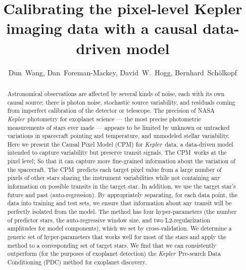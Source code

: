 \documentclass[12pt, preprint]{aastex}
\newcommand{\project}[1]{\textsl{#1}}
\newcommand{\Kepler}{\project{Kepler}}
\newcommand{\name}{CPM}
\begin{document}
\title{
  Calibrating the pixel-level Kepler imaging data with a causal data-driven model
 \\ 
}
\author{%
  Dun~Wang\altaffilmark{\ref{CCPP}},
  Dan~Foreman-Mackey\altaffilmark{\ref{CCPP}},
  David~W.~Hogg\altaffilmark{\ref{CCPP},\ref{CDS},\ref{MPIA},\ref{email}},
  Bernhard~Sch\"olkopf\altaffilmark{\ref{MPIIS}}
  }
\setcounter{address}{1}



\begin{abstract}
Astronomical observations are affected by several kinds of noise, each with its own causal source; 
there is photon noise, stochastic source variability, and residuals coming from imperfect calibration of the detector or telescope. 
The precision of NASA \Kepler\ photometry for exoplanet science ---
the most precise photometric measurements of stars ever made ---
appears to be limited by unknown or untracked variations in spacecraft pointing and temperature, 
and unmodeled stellar variability. Here we present the Causal Pixel Model (\name) for \Kepler\ data, 
a data-driven model intended to capture variability but preserve transit signals. 
The \name\ works at the pixel level; So that
it can capture more fine-grained information about the variation of the spacecraft.
The \name\ predicts each target pixel value from a large number of pixels of other stars sharing the instrument variabilities 
while not containing any information on possible transits in the target star. In addition, we use the target star’s future and past (auto-regression). 
By appropriately separating, for each data point, the data into training and test sets, 
  we ensure that information about any transit will be perfectly isolated from the model. 
The method has four hyper-parameters (the number of predictor stars, the auto-regressive window size, 
and two L2-regularization amplitudes for model components), which we set by cross-validation. 
We determine a generic set of hyper-parameters that works well for most of the stars and apply the method to a corresponding set of target stars. 
We find that we can consistently outperform (for the purposes of exoplanet detection) 
  the \Kepler\ Pre-search Data Conditioning (PDC) method for exoplanet discovery.

\end{abstract}
\end{document}
